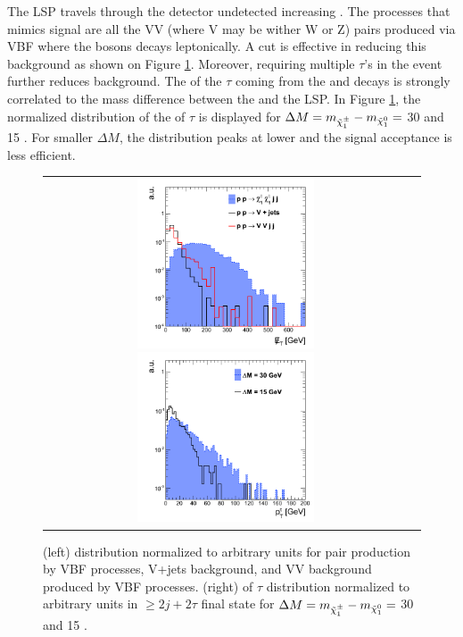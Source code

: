 The \neutralinoone LSP travels through the detector undetected increasing \met. The processes that mimics signal are all the VV (where V may be wither W or Z) pairs produced via VBF where the bosons decays leptonically. A \met cut is eﬀective in reducing this background as shown on Figure \ref{fig:VBF_met_pttau}. Moreover, requiring multiple $\tau$’s in the event further reduces background. The \pt of the \ensuremath{\tau} coming from the \charginopm and \neutralinotwo decays is strongly correlated to the mass difference between the \charginopm and the \neutralinoone LSP. In Figure \ref{fig:VBF_met_pttau}, the normalized distribution of the \pt of \ensuremath{\tau} is displayed for \ensuremath{\Delta M = m_{\charginopm} - m_{\neutralinoone} =} 30 \gev and 15 \gev. For smaller \ensuremath{\Delta M}, the distribution peaks at lower \pt and the signal acceptance is less efficient.

\begin{figure}[tbh!]
	\centering
	\begin{tabular}{cc}
		\includegraphics[width=0.50\textwidth]{analysis/pics/VBFMet.png}
		\includegraphics[width=0.50\textwidth]{analysis/pics/Pheno_VBF_TauPt.png} 		
	\end{tabular}
	\caption{(left) \met distribution normalized to arbitrary units for \charginopm \charginopm pair production by VBF processes, V+jets background, and VV background produced by VBF processes. (right) \pt of \ensuremath{\tau} distribution normalized to arbitrary units in \ensuremath{\geq 2j + 2\tau} ﬁnal state for \ensuremath{\Delta M = m_{\charginopm} - m_{\neutralinoone} =} 30 \gev and 15 \gev.}
	\label{fig:VBF_met_pttau}
\end{figure}

